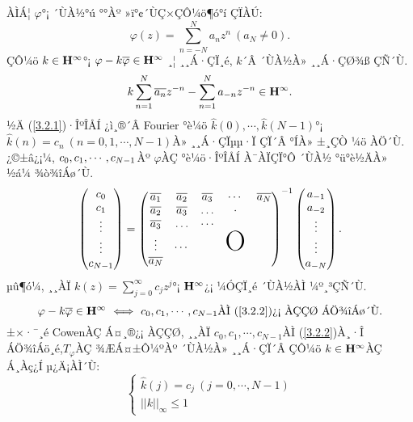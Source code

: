 \documentclass[12pt,a4paper,2sided]{article}
\newcommand{\vs}{\vspace}
\begin{document}
\vs{0.3cm} ÀÌÁ¦ $\varphi$°¡ ´ÙÀ½°ú °°Àº »ï°¢´ÙÇ×ÇÔ¼ö¶ó°í ÇÏÀÚ:
$$
\varphi(z)=\sum_{n=-N}^{N} a_{n}z^n\ (a_{N}\neq 0).
$$
ÇÔ¼ö $k\in{\bold H}^{\infty}$°¡ $\varphi -k\overline{\varphi}\in {\bold H}^{\infty}$
¸¦ ¸¸Á·ÇÏ¸é, $k$´Â ´ÙÀ½À» ¸¸Á·ÇØ¾ß ÇÑ´Ù.
\begin{equation}\label{3.2.1}
k\sum_{n=1}^{N}\overline{a_n} z^{-n} -\sum_{n=1}^{N}a_{-n}z^{-n}\in{\bold H}^{\infty}.
\end{equation}
½Ä (\ref{3.2.1})·ÎºÎÅÍ ¿ì¸®´Â Fourier °è¼ö $\widehat{k}(0),\cdots
,\widehat{k}(N-1)$°¡ $\widehat{k}(n)=c_n\ (n=0,1,\cdots,N-1)$À»
¸¸Á·ÇÏµµ·Ï ÇÏ´Â °ÍÀ» ±¸ÇÒ ¼ö ÀÖ´Ù. ¿©±â¿¡¼­,
$c_0,c_1,\cdots,\linebreak c_{N-1}$Àº $\varphi$ÀÇ °è¼ö·ÎºÎÅÍ
À¯ÀÏÇÏ°Ô ´ÙÀ½ °ü°è½ÄÀ» ½á¼­ ¾ò¾îÁø´Ù.
\begin{equation}\label{3.2.2}
\begin{pmatrix}c_0\\c_1\\ \vdots\\ \vdots\\c_{N-1}\end{pmatrix}=
\begin{pmatrix}\overline{a_1}&\overline{a_2}&\overline{a_3}&\cdots&\overline{a_N}\\
\overline{a_2}&\overline{a_3}&\hdots&\cdot\\
\overline{a_3}&\hdots&\cdots\\
\vdots&\cdots & &\mbox{{\Huge{O}}}\\
\overline{a_N}
\end{pmatrix}^{-1}
\begin{pmatrix}
a_{-1}\\ a_{-2}\\ \vdots\\ \vdots\\ a_{-N}
\end{pmatrix}.
\end{equation}
µû¶ó¼­, ¸¸ÀÏ $k(z)=\sum_{j=0}^{\infty} c_{j}z^j$°¡ ${\bold
H}^{\infty}$¿¡ ¼ÓÇÏ¸é ´ÙÀ½ÀÌ ¼º¸³ÇÑ´Ù.
$$
\varphi -k\overline{\varphi}\in {\bold H}^{\infty}\ \Longleftrightarrow
\ c_0,c_1,\cdots ,c_{N-1}\mbox{ÀÌ (\ref{3.2.2})¿¡ ÀÇÇØ ÁÖ¾îÁø´Ù}.
$$
±×·¯¸é  CowenÀÇ Á¤¸®¿¡ ÀÇÇØ, ¸¸ÀÏ $ c_0,c_1,\cdots ,c_{N-1}$ÀÌ
(\ref{3.2.2})À¸·Î ÁÖ¾îÁö¸é,\linebreak $T_\varphi$ÀÇ ¾ÆÁ¤±Ô¼ºÀº
´ÙÀ½À» ¸¸Á·ÇÏ´Â ÇÔ¼ö $k\in{\bold H}^{\infty}$ÀÇ Á¸Àç¿Í µ¿Ä¡ÀÌ´Ù:
$$
\begin{cases}\widehat{k}(j)=c_j\ (j=0,\cdots , N-1)\\||k||_{\infty}\le 1
\end{cases}
$$
\end{document}
